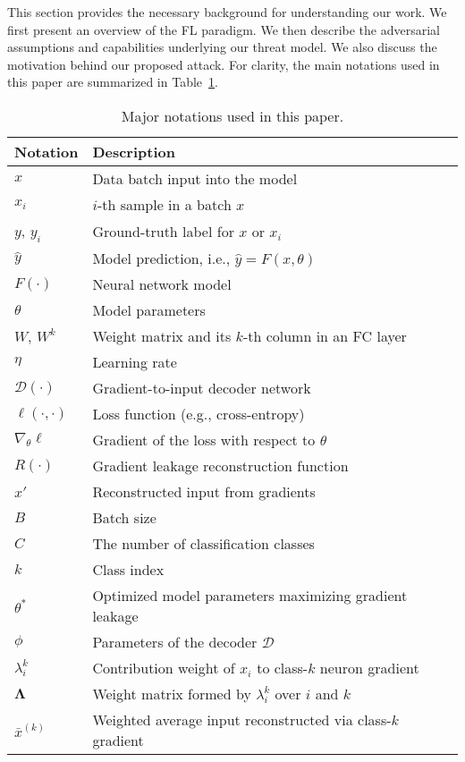 This section provides the necessary background for understanding our work. We first present an overview of the FL paradigm. We then describe the adversarial assumptions and capabilities underlying our threat model. We also discuss the motivation behind our proposed attack. For clarity, the main notations used in this paper are summarized in Table~\ref{tab:notation}.
\begin{table}[t]
\centering
\caption{Major notations used in this paper.}
\label{tab:notation}
\begin{tabular}{ll}
\toprule
Notation & Description \\
\midrule
$x$ & Data batch input into the model \\
$x_i$ & $i$-th sample in a batch $x$ \\
$y$, $y_i$ & Ground-truth label for $x$ or $x_i$ \\
$\hat{y}$ & Model prediction, i.e., $\hat{y}=F(x,\theta)$ \\
$F(\cdot)$ & Neural network model \\
$\theta$ & Model parameters \\
$W$, $W^k$ & Weight matrix and its $k$-th column in an FC layer \\
$\eta$ & Learning rate \\
$\mathcal{D}(\cdot)$ & Gradient-to-input decoder network \\
$\ell(\cdot, \cdot)$ & Loss function (e.g., cross-entropy) \\
$\nabla_\theta \ell$ & Gradient of the loss with respect to $\theta$ \\
$R(\cdot)$ & Gradient leakage reconstruction function \\
$x'$ & Reconstructed input from gradients \\
$B$ & Batch size \\
$C$ & The number of classification classes \\
$k$ & Class index \\
$\theta^*$ & Optimized model parameters maximizing gradient leakage \\
$\phi$ & Parameters of the decoder $\mathcal{D}$ \\
$\lambda_i^k$ & Contribution weight of $x_i$ to class-$k$ neuron gradient \\
$\mathbf{\Lambda}$ & Weight matrix formed by $\lambda_i^k$ over $i$ and $k$ \\
$\bar{x}^{(k)}$ & Weighted average input reconstructed via class-$k$ gradient \\

\end{tabular}
\end{table}
